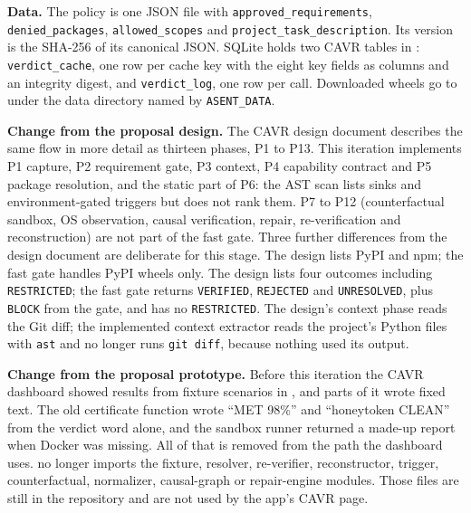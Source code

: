 \begin{sloppypar}
\textbf{Data.} The policy is one JSON file with \texttt{approved\_requirements}, \texttt{denied\_packages}, \texttt{allowed\_scopes} and \texttt{project\_task\_description}. Its version is the SHA-256 of its canonical JSON. SQLite holds two CAVR tables in : \texttt{verdict\_cache}, one row per cache key with the eight key fields as columns and an integrity digest, and \texttt{verdict\_log}, one row per  call. Downloaded wheels go to  under the data directory named by \texttt{ASENT\_DATA}.
\end{sloppypar}

\begin{sloppypar}
\textbf{Change from the proposal design.} The CAVR design document describes the same flow in more detail as thirteen phases, P1 to P13. This iteration implements P1 capture, P2 requirement gate, P3 context, P4 capability contract and P5 package resolution, and the static part of P6: the AST scan lists sinks and environment-gated triggers but does not rank them. P7 to P12 (counterfactual sandbox, OS observation, causal verification, repair, re-verification and reconstruction) are not part of the fast gate. Three further differences from the design document are deliberate for this stage. The design lists PyPI and npm; the fast gate handles PyPI wheels only. The design lists four outcomes including \texttt{RESTRICTED}; the fast gate returns \texttt{VERIFIED}, \texttt{REJECTED} and \texttt{UNRESOLVED}, plus \texttt{BLOCK} from the gate, and has no \texttt{RESTRICTED}. The design's context phase reads the Git diff; the implemented context extractor reads the project's Python files with \texttt{ast} and no longer runs \texttt{git diff}, because nothing used its output.
\end{sloppypar}

\begin{sloppypar}
\textbf{Change from the proposal prototype.} Before this iteration the CAVR dashboard showed results from fixture scenarios in , and parts of it wrote fixed text. The old certificate function wrote ``MET 98\%'' and ``honeytoken CLEAN'' from the verdict word alone, and the sandbox runner returned a made-up report when Docker was missing. All of that is removed from the path the dashboard uses.  no longer imports the fixture, resolver, re-verifier, reconstructor, trigger, counterfactual, normalizer, causal-graph or repair-engine modules. Those files are still in the repository and are not used by the app's CAVR page.
\end{sloppypar}

